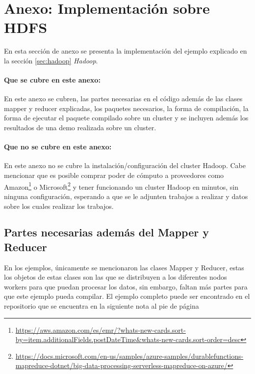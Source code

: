 \clearpage
\section*{Anexo: Implementación sobre HDFS}

En esta sección de anexo se presenta la implementación del ejemplo
explicado en la sección \ref{sec:hadoop} {\it Hadoop}. 

\paragraph{Que se cubre en este anexo:}
En este anexo se cubren,
las partes necesarias en el código además de las clases mapper y reducer
explicadas, los paquetes necesarios, la forma de compilación, la forma de
ejecutar el paquete compilado sobre un cluster y se incluyen además los
resultados de una demo realizada sobre un \gls{cluster}.

\paragraph{Que no se cubre en este anexo:}
En este anexo no se cubre la
instalación/configuración del \gls{cluster} Hadoop. Cabe mencionar que es
posible comprar poder de cómputo a proveedores como Amazon\footnote{\url{https://aws.amazon.com/es/emr/?whats-new-cards.sort-by=item.additionalFields.postDateTime&whats-new-cards.sort-order=desc}} o
Microsoft\footnote{\url{https://docs.microsoft.com/en-us/samples/azure-samples/durablefunctions-mapreduce-dotnet/big-data-processing-serverless-mapreduce-on-azure/}}
y tener funcionando un cluster Hadoop en minutos, sin ninguna configuración,
esperando a que se le adjunten trabajos a realizar y datos sobre los cuales
realizar los trabajos.

\subsection*{Partes necesarias además del Mapper y Reducer}
En los ejemplos, únicamente se mencionaron las clases Mapper y Reducer, estas
los objetos de estas clases son las que se distribuyen a los diferentes nodos
workers para que puedan procesar los datos, sin embargo, faltan más partes para
que este ejemplo pueda compilar. El ejemplo completo puede ser encontrado en
el repositorio que se encuentra en la siguiente nota al pie de
página%



